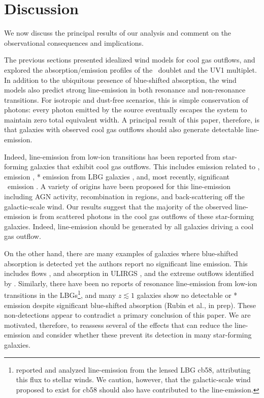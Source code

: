 \documentclass[12pt,preprint]{aastex}
\begin{document}
\section{Discussion}
\label{sec:discuss}

We now discuss the principal results of our analysis and comment on
the observational consequences and implications. 

The previous sections presented idealized wind models for
cool gas outflows, and explored the absorption/emission profiles of
the \mgiid\ doublet and the  UV1 multiplet.  In addition to
the ubiquitous presence of blue-shifted absorption, the wind models
also predict strong line-emission in both resonance
and non-resonance transitions.  For isotropic and dust-free scenarios,
this is simple conservation of photons: every photon emitted by
the source eventually escapes the system to maintain
zero total equivalent width. A principal result of this paper,
therefore, is that galaxies with observed cool gas outflows should
also generate detectable line-emission.
 
Indeed, line-emission from low-ion transitions has been reported from 
star-forming galaxies that exhibit cool gas outflows.  
This includes emission related to  \citep{phillips93,cth+10},
 emission \citep{wcp+09,rwk+10}, 
* emission from LBG galaxies \citep{shapley03},
and, most recently, significant \feiis\ emission \citep{rubin+10c}. 
A variety of origins have been proposed for this
line-emission including AGN activity, recombination in 
regions, and back-scattering off the galactic-scale wind.
Our results suggest that the majority of the observed line-emission is 
from scattered photons in the cool gas outflows of these star-forming
galaxies.  Indeed, line-emission should be generated by all 
galaxies driving a cool gas outflow.

On the other hand,
there are many examples of galaxies where blue-shifted absorption is
detected yet the authors report no significant line emission.  This
includes  flows \citep{rvs05a,martin05,smn+09}, 
 and  absorption in
ULIRGS \citep{mb09}, and the extreme  outflows identified
by \cite{tmd07}.  Similarly, there have been no reports of
resonance line-emission from low-ion transitions in the
LBGs\footnote{\citet{psa+00}
  reported and analyzed  line-emission from the lensed LBG
  cb58, attributing this flux to stellar winds.  We caution, however,
  that the galactic-scale wind proposed to exist for cb58 should also
  have contributed to the  line-emission.}, and many
$z \lesssim 1$ galaxies show no detectable  or *
emission despite significant blue-shifted absorption (Rubin et al., in prep). 
These non-detections appear to contradict a primary conclusion of 
this paper.   We are motivated, therefore, to
reassess several of the effects that can reduce the line-emission
and consider whether these prevent its detection in many
star-forming galaxies.  
\end{document}
